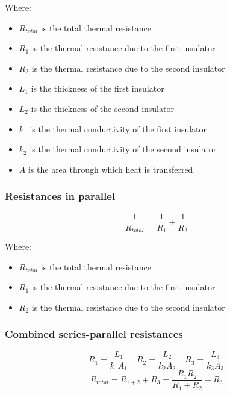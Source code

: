 \documentclass[11pt]{article}
\begin{document}
Where:
\begin{itemize}
\item \(R_{total}\) is the total thermal resistance
\item \(R_1\) is the thermal resistance due to the first insulator
\item \(R_2\) is the thermal resistance due to the second insulator
\item \(L_1\) is the thickness of the first insulator
\item \(L_2\) is the thickness of the second insulator
\item \(k_1\) is the thermal conductivity of the first insulator
\item \(k_2\) is the thermal conductivity of the second insulator
\item \(A\) is the area through which heat is transferred
\end{itemize}

\subsubsection{Resistances in parallel}
\label{sec:org88443d3}
\[\frac{1}{R_{total}} = \frac{1}{R_1} + \frac{1}{R_2}\]

Where:
\begin{itemize}
\item \(R_{total}\) is the total thermal resistance
\item \(R_1\) is the thermal resistance due to the first insulator
\item \(R_2\) is the thermal resistance due to the second insulator
\end{itemize}

\subsubsection{Combined series-parallel resistances}
\label{sec:org9e9a55c}
\[R_1 = \frac{L_1}{k_1 A_1} \quad R_2 = \frac{L_2}{k_2 A_2} \quad R_3 = \frac{L_3}{k_3 A_3}\]
\[R_{total} = R_{1 + 2} + R_3 = \frac{R_1 R_2}{R_1 + R_2} + R_3\]
\end{document}
